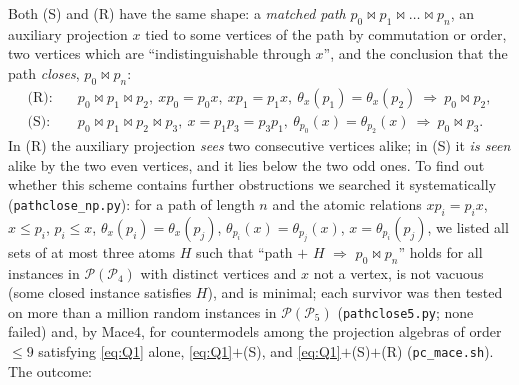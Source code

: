 \documentclass[11pt]{amsart}
\theoremstyle{definition}
\renewcommand{\P}{\mathcal{P}}
\begin{document}
Both (S) and (R) have the same shape: a \emph{matched path} $p_0\bowtie p_1\bowtie\dots\bowtie p_n$, an auxiliary projection $x$ tied to some vertices of the path by commutation or order, two vertices which are ``indistinguishable through $x$'', and the conclusion that the path \emph{closes}, $p_0\bowtie p_n$:
\begin{align*}
\text{(R)}:\quad& p_0\bowtie p_1\bowtie p_2,\ xp_0=p_0x,\ xp_1=p_1x,\ \theta_x(p_1)=\theta_x(p_2)\ \Longrightarrow\ p_0\bowtie p_2,\\
\text{(S)}:\quad& p_0\bowtie p_1\bowtie p_2\bowtie p_3,\ x=p_1p_3=p_3p_1,\ \theta_{p_0}(x)=\theta_{p_2}(x)\ \Longrightarrow\ p_0\bowtie p_3 .
\end{align*}
In (R) the auxiliary projection \emph{sees} two consecutive vertices alike; in (S) it \emph{is seen} alike by the two even vertices, and it lies below the two odd ones. To find out whether this scheme contains further obstructions we searched it systematically (\texttt{pathclose\_np.py}): for a path of length $n$ and the atomic relations $xp_i=p_ix$, $x\le p_i$, $p_i\le x$, $\theta_x(p_i)=\theta_x(p_j)$, $\theta_{p_i}(x)=\theta_{p_j}(x)$, $x=\theta_{p_i}(p_j)$, we listed all sets of at most three atoms $H$ such that ``path $+$ $H$ $\Rightarrow$ $p_0\bowtie p_n$'' holds for all instances in $\P(\P_4)$ with distinct vertices and $x$ not a vertex, is not vacuous (some closed instance satisfies $H$), and is minimal; each survivor was then tested on more than a million random instances in $\P(\P_5)$ (\texttt{pathclose5.py}; none failed) and, by Mace4, for countermodels among the projection algebras of order $\le9$ satisfying \eqref{eq:Q1} alone, \eqref{eq:Q1}$+$(S), and \eqref{eq:Q1}$+$(S)$+$(R) (\texttt{pc\_mace.sh}). The outcome:
\end{document}
